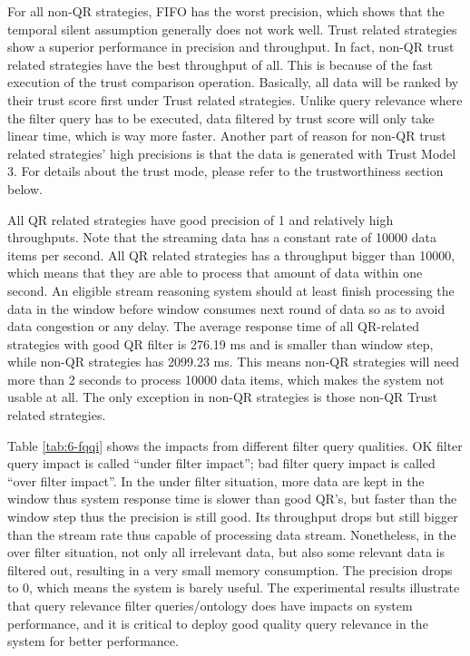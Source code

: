 For all non-QR strategies, FIFO has the worst precision, which shows that the temporal silent assumption generally does not work well.
Trust related strategies show a superior performance in precision and throughput. 
In fact, non-QR trust related strategies have the best throughput of all.
This is because of the fast execution of the trust comparison operation.
Basically, all data will be ranked by their trust score first under Trust related strategies. 
Unlike query relevance where the filter query has to be executed, data filtered by trust score will only take linear time, which is way more faster.
Another part of reason for non-QR trust related strategies' high precisions is that the data is generated with Trust Model 3. 
For details about the trust mode, please refer to the trustworthiness section below. 

All QR related strategies have good precision of 1 and relatively high throughputs. 
Note that the streaming data has a constant rate of 10000 data items per second. 
All QR related strategies has a throughput bigger than 10000, which means that they are able to process that amount of data within one second.
An eligible stream reasoning system should at least finish processing the data in the window before window consumes next round of data so as to avoid data congestion or any delay. 
The average response time of all QR-related strategies with good QR filter is 276.19 ms and is smaller than window step, while non-QR strategies has 2099.23 ms. 
This means non-QR strategies will need more than 2 seconds to process 10000 data items, which makes the system not usable at all. 
The only exception in non-QR strategies is those non-QR Trust related strategies. 

Table \ref{tab:6-fqqi} shows the impacts from different filter query qualities. 
OK filter query impact is called ``under filter impact''; bad filter query impact is called ``over filter impact''.
In the under filter situation, more data are kept in the window thus system response time is slower than good QR's, but faster than the window step thus the precision is still good.
Its throughput drops but still bigger than the stream rate thus capable of processing data stream. 
Nonetheless, in the over filter situation, not only all irrelevant data, but also some relevant data is filtered out, resulting in a very small memory consumption. 
The precision drops to 0, which means the system is barely useful.
The experimental results illustrate that query relevance filter queries/ontology does have impacts on system performance, and it is critical to deploy good quality query relevance in the system for better performance. 
%
